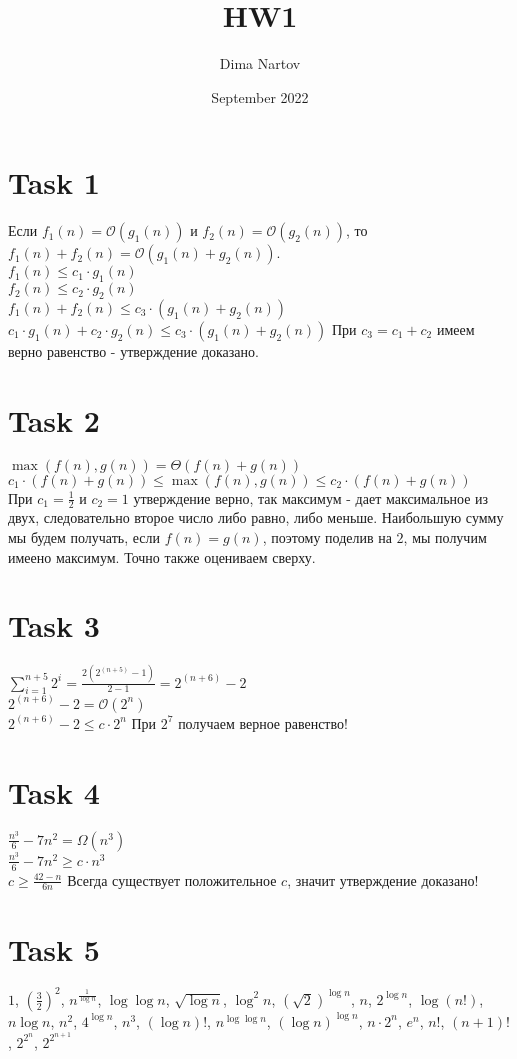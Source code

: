 \documentclass[11pt,a4paper,oneside]{article}
\title{HW1}
\author{Dima Nartov}
\date{September 2022}
\begin{document}
\maketitle

\section{Task 1}
    Если $f_1(n) = \mathcal{O}(g_1(n))$ и $f_2(n) = \mathcal{O}(g_2(n))$, то $f_1(n) + f_2(n) = \mathcal{O}(g_1(n) + g_2(n))$.
    \\
    $f_1(n) \leq c_1 \cdot g_1(n)$
    \\
    $f_2(n) \leq c_2 \cdot g_2(n)$
    \\
    $f_1(n) + f_2(n) \leq c_3 \cdot (g_1(n) + g_2(n))$
    \\
    $c_1 \cdot g_1(n) + c_2 \cdot g_2(n) \leq c_3 \cdot (g_1(n) + g_2(n))$ При $c_3 = c_1 + c_2$ имеем верно равенство - утверждение доказано.
\section{Task 2}
    $\max(f(n), g(n)) = \Theta(f(n) + g(n))$
    \\
    $c_1 \cdot (f(n) + g(n)) \leq \max(f(n), g(n)) \leq c_2 \cdot (f(n) + g(n))$
    \\
    При $c_1 = \frac{1}{2}$ и $c_2 = 1$ утверждение верно, так максимум - дает максимальное из двух, следовательно второе число либо равно, либо меньше. Наибольшую сумму мы будем получать, если $f(n) = g(n)$, поэтому поделив на $2$, мы получим имеено максимум. Точно также оцениваем сверху.
\section{Task 3}
    $\sum \limits_{i=1}^{n + 5} 2^i = \frac{2(2^{(n+5)} - 1)}{2 - 1} = 2^{(n+6)}-2$
    \\
    $2^{(n+6)}-2 = \mathcal{O}(2^n)$
    \\
    $2^{(n+6)}-2 \leq c \cdot 2^n$ 
    При $2^7$ получаем верное равенство!
\section{Task 4}
    $\frac{n^3}{6} - 7n^2 = \Omega(n^3)$
    \\
    $\frac{n^3}{6} - 7n^2 \geq c \cdot n^3$
    \\
    $c \geq \frac{42 - n}{6n}$
    Всегда существует положительное $c$, значит утверждение доказано!
\section{Task 5}
    $1$, $(\frac{3}{2})^2$, $n^{\frac{1}{\log n}}$, $\log \log n$, $\sqrt{\log n}$, $\log^2 n$, $(\sqrt{2})^{\log n}$, $n$, $2^{\log n}$, $\log (n!)$, $n \log n$, $n^2$, $4^{\log n}$, $n^3$, $(\log n)!$, $n^{\log \log n}$, $(\log n)^{\log n}$, $n \cdot 2^n$, $e^n$, $n!$, $(n + 1)!$, $2^{2^n}$, $2^{2^{n + 1}}$
\end{document}
